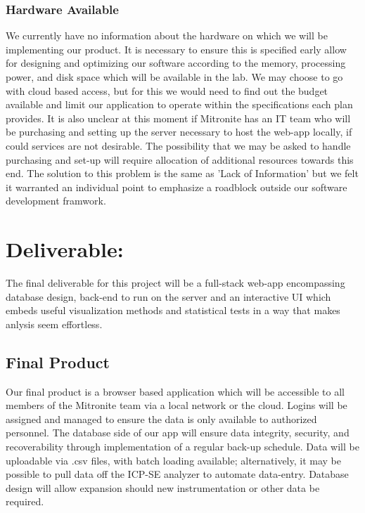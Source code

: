 \documentclass[10pt,twocolumn,letterpaper]{article}
\begin{document}
            \subsubsection{Hardware Available}
                     We currently have no information about the hardware on which we will be implementing our product. It is necessary to ensure this is specified early allow for designing and optimizing our software according to the memory, processing power, and disk space which will be available in the lab. We may choose to go with cloud based access, but for this we would need to find out the budget available and limit our application to operate within the specifications each plan provides. It is also unclear at this moment if Mitronite has an IT team who will be purchasing and setting up the server necessary to host the web-app locally, if could services are not desirable. The possibility that we may be asked to handle purchasing and set-up will require allocation of additional resources towards this end. The solution to this problem is the same as 'Lack of Information' but we felt it warranted an individual point to emphasize a roadblock outside our software development framwork.

    	\section{Deliverable:}

        The final deliverable for this project will be a full-stack web-app encompassing database design, back-end to run on the server and an interactive UI which embeds useful visualization methods and statistical tests in a way that makes anlysis seem effortless.

            \subsection{Final Product}

            Our final product is a browser based application which will be accessible to all members of the Mitronite team via a local network or the cloud. Logins will be assigned and managed to ensure the data is only available to authorized personnel. The database side of our app will ensure data integrity, security, and recoverability through implementation of a regular back-up schedule. Data will be uploadable via .csv files, with batch loading available; alternatively, it may be possible to pull data off the ICP-SE analyzer to automate data-entry. Database design will allow expansion should new instrumentation or other data be required.
\end{document}
